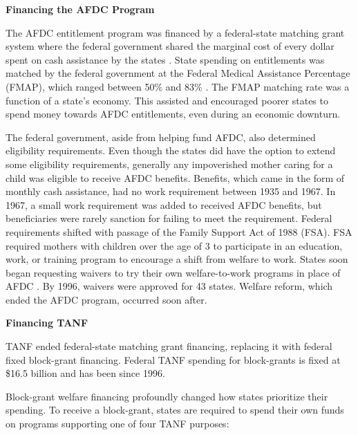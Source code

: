 \documentclass[12pt,letterpaperpaper,]{book}
\begin{document}
\textbf{Financing the AFDC Program}

The AFDC entitlement program was financed by a federal-state matching
grant system where the federal government shared the marginal cost of
every dollar spent on cash assistance by the states
\citep{ziliak_temporary_2015}. State spending on entitlements was
matched by the federal government at the Federal Medical Assistance
Percentage (FMAP), which ranged between 50\% and 83\%
\citep{falk_temporary_2016}. The FMAP matching rate was a function of a
state's economy. This assisted and encouraged poorer states to spend
money towards AFDC entitlements, even during an economic downturn.

The federal government, aside from helping fund AFDC, also determined
eligibility requirements. Even though the states did have the option to
extend some eligibility requirements, generally any impoverished mother
caring for a child was eligible to receive AFDC benefits. Benefits,
which came in the form of monthly cash assistance, had no work
requirement between 1935 and 1967. In 1967, a small work requirement was
added to received AFDC benefits, but beneficiaries were rarely sanction
for failing to meet the requirement. Federal requirements shifted with
passage of the Family Support Act of 1988 (FSA). FSA required mothers
with children over the age of 3 to participate in an education, work, or
training program to encourage a shift from welfare to work. States soon
began requesting waivers to try their own welfare-to-work programs in
place of AFDC \citep{blank_what_2007}. By 1996, waivers were approved
for 43 states. Welfare reform, which ended the AFDC program, occurred
soon after.

\textbf{Financing TANF}

TANF ended federal-state matching grant financing, replacing it with
federal fixed block-grant financing. Federal TANF spending for
block-grants is fixed at \$16.5 billion and has been since 1996.

Block-grant welfare financing profoundly changed how states prioritize
their spending. To receive a block-grant, states are required to spend
their own funds on programs supporting one of four TANF purposes:
\end{document}
